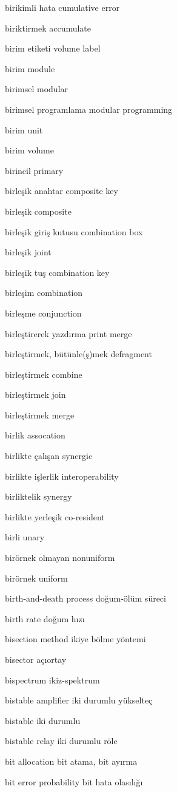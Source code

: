 \documentclass[12pt,fleqn]{article}\usepackage{../../common}
\begin{document}
birikimli hata cumulative error

biriktirmek accumulate

birim etiketi volume label

birim module

birimsel modular

birimsel programlama modular programming

birim unit

birim volume

birincil primary

birleşik anahtar composite key

birleşik composite

birleşik giriş kutusu combination box

birleşik joint

birleşik tuş combination key

birleşim combination

birleşme conjunction

birleştirerek yazdırma print merge

birleştirmek, bütünle(ş)mek defragment

birleştirmek combine

birleştirmek join

birleştirmek merge

birlik assocation

birlikte çalışan synergic

birlikte işlerlik interoperability

birliktelik synergy

birlikte yerleşik co-resident

birli unary

birörnek olmayan nonuniform

birörnek uniform

birth-and-death process doğum-ölüm süreci

birth rate doğum hızı

bisection method ikiye bölme yöntemi

bisector açıortay

bispectrum ikiz-spektrum

bistable amplifier iki durumlu yükselteç

bistable iki durumlu

bistable relay iki durumlu röle

bit allocation bit atama, bit ayırma

bit error probability bit hata olasılığı
\end{document}
